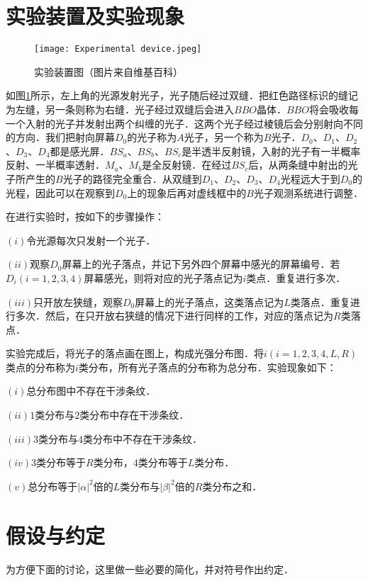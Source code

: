 
\section{实验装置及实验现象}
\begin{figure}[ht]
\centering
\texttt{[image: Experimental device.jpeg]}
\caption{实验装置图（图片来自维基百科）}
\label{fig:Experimental device}
\end{figure}
如图\ref{fig:Experimental device}所示，左上角的光源发射光子，光子随后经过双缝．把红色路径标识的缝记为左缝，另一条则称为右缝．光子经过双缝后会进入$BBO$晶体．$BBO$将会吸收每一个入射的光子并发射出两个纠缠的光子．这两个光子经过棱镜后会分别射向不同的方向．我们把射向屏幕$D_0$的光子称为$A$光子，另一个称为$B$光子．$D_0$、$D_1$、$D_2$、$D_3$、$D_4$都是感光屏．$BS_a$、$BS_b$、$BS_c$是半透半反射镜，入射的光子有一半概率反射、一半概率透射．$M_a$、$M_b$是全反射镜．在经过$BS_c$后，从两条缝中射出的光子所产生的$B$光子的路径完全重合．从双缝到$D_1$、$D_2$、$D_3$、$D_4$光程远大于到$D_0$的光程，因此可以在观察到$D_0$上的现象后再对虚线框中的$B$光子观测系统进行调整．

在进行实验时，按如下的步骤操作：

$(i)$令光源每次只发射一个光子．

$(ii)$观察$D_0$屏幕上的光子落点，并记下另外四个屏幕中感光的屏幕编号．若$D_i(i=1,2,3,4)$屏幕感光，则将对应的光子落点记为$i$类点．重复进行多次．

$(iii)$只开放左狭缝，观察$D_0$屏幕上的光子落点，这类落点记为$L$类落点．重复进行多次．然后，在只开放右狭缝的情况下进行同样的工作，对应的落点记为$R$类落点．


实验完成后，将光子的落点画在图上，构成光强分布图．将$i(i=1,2,3,4,L,R)$类点的分布称为$i$类分布，所有光子落点的分布称为总分布．实验现象如下：

$(i)$总分布图中不存在干涉条纹．

$(ii)$$1$类分布与$2$类分布中存在干涉条纹．

$(iii)$$3$类分布与$4$类分布中不存在干涉条纹．

$(iv)$$3$类分布等于$R$类分布，$4$类分布等于$L$类分布．

$(v)$总分布等于$|\alpha|^2$倍的$L$类分布与$|\beta|^2$倍的$R$类分布之和．

\section{假设与约定}
为方便下面的讨论，这里做一些必要的简化，并对符号作出约定．

